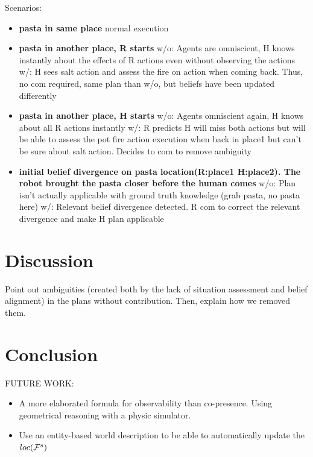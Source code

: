 \documentclass[letterpaper]{article} %
\begin{document}
Scenarios:
\begin{itemize}
    \item \textbf{pasta in same place}
        normal execution
    
    \item \textbf{pasta in another place, R starts}
        w/o: Agents are omniscient, H knows instantly about the effects of R actions even without observing the actions
        w/: H sees salt action and assess the fire on action when coming back. Thus, no com required, same plan than w/o, but beliefs have been updated differently
        
    \item \textbf{pasta in another place, H starts}
        w/o: Agents omniscient again, H knows about all R actions instantly
        \subitem w/: R predicts H will miss both actions but will be able to assess the pot fire action execution when back in place1 but can't be sure about salt action. Decides to com to remove ambiguity
    
    \item \textbf{initial belief divergence on pasta location(R:place1 H:place2). The robot brought the pasta closer before the human comes}
        \subitem w/o: Plan isn't actually applicable with ground truth knowledge (grab pasta, no pasta here)
        \subitem w/: Relevant belief divergence detected. R com to correct the relevant divergence and make H plan applicable
    
\end{itemize}

\section{Discussion}

Point out ambiguities (created both by the lack of situation assessment and belief alignment) in the plans without contribution. Then, explain how we removed them. 

\section{Conclusion}

FUTURE WORK:
\begin{itemize}
    \item A more elaborated formula for observability than co-presence. Using geometrical reasoning with a physic simulator.
    \item Use an entity-based world description to be able to automatically update the $loc(\mathcal{F}^{s}_{}{})$
\end{itemize}


\end{document}
